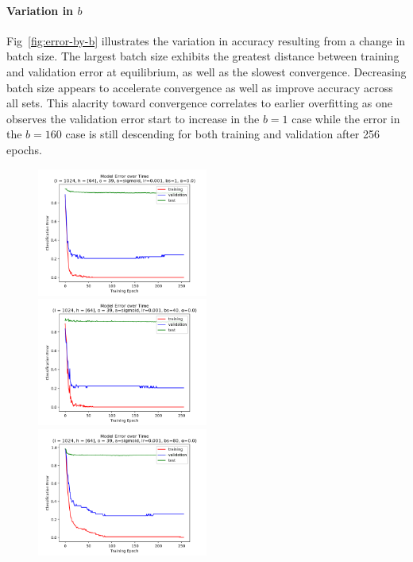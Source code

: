 \documentclass[10pt,epsf]{article}
\begin{document}
{{    \paragraph{Variation in $b$}{
      Fig~\ref{fig:error-by-b} illustrates the variation in accuracy resulting from a change in batch size.
      The largest batch size exhibits the greatest distance between training and validation error
      at equilibrium, as well as the slowest convergence. Decreasing batch size appears to accelerate
      convergence as well as improve accuracy across all sets. This alacrity toward convergence
      correlates to earlier overfitting as one observes the validation error start to increase in the
      $b = 1$ case while the error in the $b = 160$ case is still descending for both training and
      validation after 256 epochs.
    }
    \begin{figure}[h]
      \includegraphics[width=0.5\textwidth]{./img/64-0.001-1-0-sigmoid-1/error-255.png}
      \includegraphics[width=0.5\textwidth]{./img/64-0.001-40-0-sigmoid-1/error-255.png}
      \includegraphics[width=0.5\textwidth]{./img/64-0.001-80-0-sigmoid-1/error-255.png}

\end{figure}}}
\end{document}
